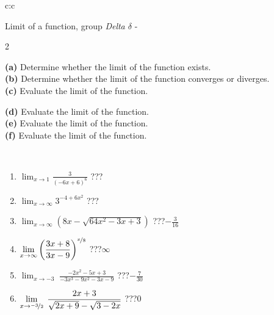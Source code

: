 \documentclass[10pt]{report}
\begin{document}
\newpage
\thispagestyle{empty}
\begin{tabular}{c:c}
\begin{minipage}[c][104.5mm][t]{0.5\linewidth}
\begin{center}
\vspace{5mm}
{\huge Limit of a function, group \textit{Delta $\delta$} -}\\[5mm]
\begin{minipage}{0.95\linewidth}
\begin{center}
{\small \begin{multicols}{2} \raggedright
\textbf{(a)} Determine whether the limit of the function exists. \\[1mm]
\textbf{(b)} Determine whether the limit of the function converges or diverges. \\[1mm]
\textbf{(c)} Evaluate the limit of the function. \par \columnbreak
\textbf{(d)} Evaluate the limit of the function. \\[1mm]
\textbf{(e)} Evaluate the limit of the function. \\[1mm]
\textbf{(f)} Evaluate the limit of the function. \\[1mm]
\end{multicols}
}
\end{center}
\end{minipage}
\\[1mm]
\begin{minipage}{0.79\linewidth}
\begin{center}
\begin{varwidth}{\linewidth}
\setlength{\itemsep}{0pt}
\begin{enumerate}
\normalsize
\item $\displaystyle\lim_{x\to1}{\frac{3}{(-6x+6)^{6}}}$\quad \dotfill\; ???\;\dotfill \quad {}
\item $\displaystyle\lim_{x\to\infty}{3^{-4+6x^2}}$\quad \dotfill\; ???\;\dotfill \quad {}
\item $\displaystyle\lim_{x\to\infty}{\left(8x - \sqrt{64x^2-3x+3}\right)}$\quad \dotfill\; ???\;\dotfill \quad $-\frac{3}{16}$
\item $\displaystyle\lim_{x\to\infty}{\left( \frac{3x+8}{3x-9} \right)^{\nicefrac{x}{8}}}$\quad \dotfill\; ???\;\dotfill \quad $\infty$
\item $\displaystyle\lim_{x\to -3}{\;\frac{-2x^2-5x+3}{-3x^3-9x^2-3x-9}}$\quad \dotfill\; ???\;\dotfill \quad $-\frac{7}{30}$
\item $\displaystyle\lim_{x\to \nicefrac{-3}{2}}{\;\frac{2x+3}{\sqrt{2x+9} - \sqrt{3-2x}}}$\quad \dotfill\; ???\;\dotfill \quad $0$

\end{enumerate}
\end{varwidth}
\end{center}
\end{minipage}
\end{center}
\end{minipage}
\end{tabular}
\end{document}
